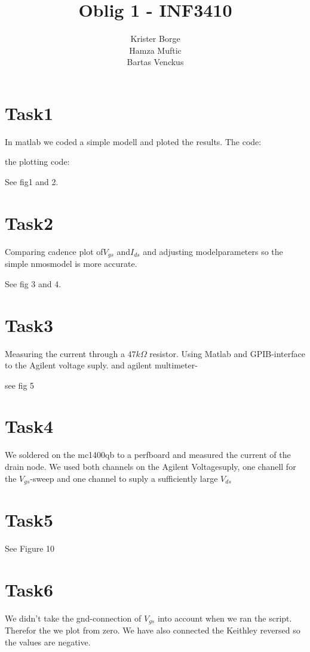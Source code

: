 \documentclass[11pt,a4paper]{report}
\title{Oblig 1 - INF3410}
\author{Krister Borge \\Hamza Muftic \\Bartas Venckus}
\begin{document}
\maketitle

\section{Task1}
In matlab we coded a simple modell and ploted the results.
The code:

the plotting code:


See fig1 and 2.


\section{Task2}
Comparing cadence plot of$ V_{gs}$ and$ I_{ds}$ and adjusting modelparameters so the simple nmosmodel is more accurate.

See fig 3 and 4.


\section{Task3}
Measuring the current through a $47k\Omega$ resistor. 
Using Matlab and GPIB-interface to the Agilent voltage suply.
and agilent multimeter-

see fig 5 
\section{Task4}
We soldered on the mc1400qb to a perfboard and measured the current of the drain node. We used both channels on the Agilent Voltagesuply, one chanell for the $V_{gs}$-sweep and one channel to suply a sufficiently large $V_{ds}$



 
 
 
\section{Task5}
See Figure 10

\section{Task6}
We didn't take the  gnd-connection of $V_{gs}$ into account when we ran the script. Therefor the we plot from zero. We have also connected the Keithley reversed so the values are negative.
\end{document}

